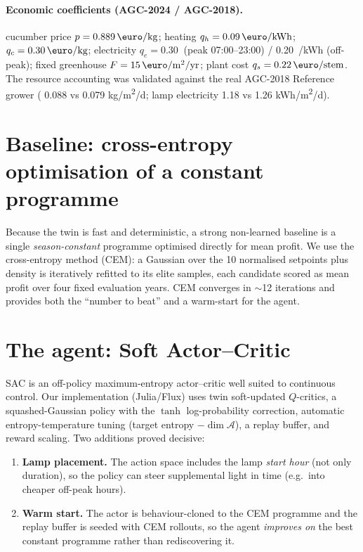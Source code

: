 \documentclass[11pt,a4paper]{article}
\begin{document}
\paragraph{Economic coefficients (AGC-2024 / AGC-2018).}
cucumber price $p=\SI{0.889}{\text{\euro}/kg}$; heating $q_h=\SI{0.09}{\text{\euro}/kWh}$;
 $q_c=\SI{0.30}{\text{\euro}/kg}$; electricity $q_e=\SI{0.30}{}$ (peak
07:00--23:00) / \SI{0.20}{\text{\euro}/kWh} (off-peak); fixed greenhouse $F=\SI{15}{\text{\euro}/m^2/yr}$;
plant cost $q_s=\SI{0.22}{\text{\euro}/stem}$. The resource accounting was validated against the real
AGC-2018 Reference grower ( 0.088 vs 0.079 \si{kg/m^2/d}; lamp electricity 1.18 vs 1.26
\si{kWh/m^2/d}).

\section{Baseline: cross-entropy optimisation of a constant programme}
Because the twin is fast and deterministic, a strong non-learned baseline is a single
\emph{season-constant} programme optimised directly for mean profit. We use the cross-entropy method
(CEM): a Gaussian over the 10 normalised setpoints plus density is iteratively refitted to its
elite samples, each candidate scored as mean profit over four fixed evaluation years. CEM converges
in $\sim$12 iterations and provides both the ``number to beat'' and a warm-start for the agent.

\section{The agent: Soft Actor--Critic}
SAC is an off-policy maximum-entropy actor--critic well suited to continuous control. Our
implementation (Julia/Flux) uses twin soft-updated $Q$-critics, a squashed-Gaussian policy with the
$\tanh$ log-probability correction, automatic entropy-temperature tuning (target entropy
$-\dim\mathcal{A}$), a replay buffer, and reward scaling. Two additions proved decisive:
\begin{enumerate}[leftmargin=1.8em,itemsep=1pt]
  \item \textbf{Lamp placement.} The action space includes the lamp \emph{start hour} (not only
  duration), so the policy can steer supplemental light in time (e.g.\ into cheaper off-peak hours).
  \item \textbf{Warm start.} The actor is behaviour-cloned to the CEM programme and the replay buffer
  is seeded with CEM rollouts, so the agent \emph{improves on} the best constant programme rather than
  rediscovering it.
\end{enumerate}
\end{document}
